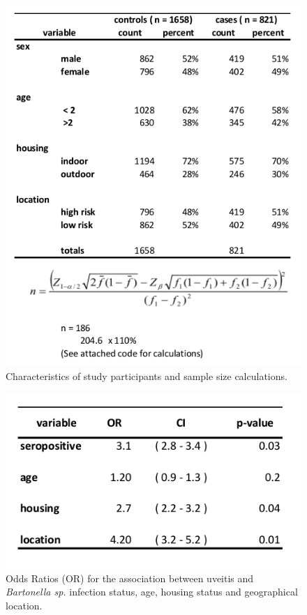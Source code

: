 \documentclass[11pt,twocolumn]{article}
\begin{document}
\begin{figure}[h!]
	\centering
	\includegraphics[scale=0.5]{table1.jpg}
	\caption{Characteristics of study participants and sample size calculations.}
	\label{tab:1}
\end{figure}
 
\begin{figure}[h!]
	\centering
	\includegraphics[scale=0.7]{table2.jpg}
	\caption{Odds Ratios (OR) for the association between uveitis and \emph{Bartonella sp.} infection status, age, housing status and geographical location.}
	\label{tab:2}
\end{figure}
\end{document}
